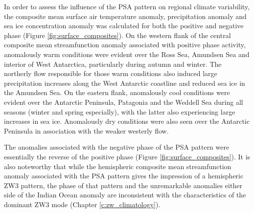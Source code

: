 In order to assess the influence of the PSA pattern on regional climate variability, the composite mean surface air temperature anomaly, precipitation anomaly and sea ice concentration anomaly was calculated for both the positive and negative phase (Figure \ref{fig:surface_composites}). On the western flank of the central composite mean streamfunction anomaly associated with positive phase activity, anomalously warm conditions were evident over the Ross Sea, Amundsen Sea and interior of West Antarctica, particularly during autumn and winter. The northerly flow responsible for those warm conditions also induced large precipitation increases along the West Antarctic coastline and reduced sea ice in the Amundsen Sea. On the eastern flank, anomalously cool conditions were evident over the Antarctic Peninsula, Patagonia and the Weddell Sea during all seasons (winter and spring especially), with the latter also experiencing large increases in sea ice. Anomalously dry conditions were also seen over the Antarctic Peninsula in association with the weaker westerly flow. 

The anomalies associated with the negative phase of the PSA pattern were essentially the reverse of the positive phase (Figure \ref{fig:surface_composites}). It is also noteworthy that while the hemispheric composite mean streamfunction anomaly associated with the PSA pattern gives the impression of a hemispheric ZW3 pattern, the phase of that pattern and the unremarkable anomalies either side of the Indian Ocean anomaly are inconsistent with the characteristics of the dominant ZW3 mode (Chapter \ref{c:zw_climatology}).

